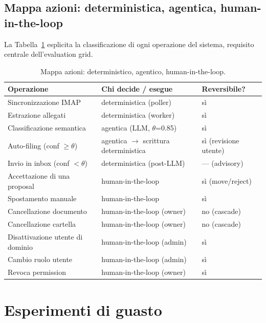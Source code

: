 \documentclass[11pt,a4paper,oneside]{article}
\begin{document}
\subsection{Mappa azioni: deterministica, agentica, human-in-the-loop}
La Tabella~\ref{tab:action-map} esplicita la classificazione di ogni
operazione del sistema, requisito centrale dell'evaluation grid.

\begin{table}[ht]
\centering
\small
\begin{tabularx}{\linewidth}{l X l}
\toprule
\textbf{Operazione} & \textbf{Chi decide / esegue} & \textbf{Reversibile?} \\
\midrule
Sincronizzazione IMAP                 & deterministica (poller)     & sì \\
Estrazione allegati                   & deterministica (worker)      & sì \\
Classificazione semantica             & agentica (LLM, $\theta$=0.85) & sì \\
Auto-filing (conf $\geq \theta$)      & agentica $\rightarrow$ scrittura deterministica & sì (revisione utente) \\
Invio in inbox (conf $< \theta$)      & deterministica (post-LLM)    & --- (advisory) \\
Accettazione di una proposal          & human-in-the-loop            & sì (move/reject) \\
Spostamento manuale                   & human-in-the-loop            & sì \\
Cancellazione documento               & human-in-the-loop (owner)    & no (cascade) \\
Cancellazione cartella                & human-in-the-loop (owner)    & no (cascade) \\
Disattivazione utente di dominio      & human-in-the-loop (admin)    & sì \\
Cambio ruolo utente                   & human-in-the-loop (admin)    & sì \\
Revoca permission                     & human-in-the-loop (owner)    & sì \\
\bottomrule
\end{tabularx}
\caption{Mappa azioni: deterministico, agentico, human-in-the-loop.}
\label{tab:action-map}
\end{table}

\section{Esperimenti di guasto}
\end{document}

